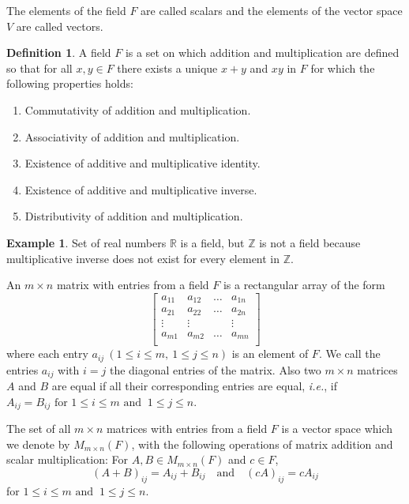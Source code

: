 \documentclass[12pt, a4paper]{article}
\theoremstyle{definition}
\newtheorem{definition}{Definition}[section]
\newtheorem{example}{Example}[section]
\theoremstyle{remark}
\theoremstyle{solution}
\begin{document}
The elements of the field $F$ are called scalars and the elements of the vector space $V$ are called vectors.

\begin{definition}
    A field $F$ is a set on which addition and multiplication are defined so that for all $x,y \in F$ there exists a unique $x + y$ and $xy$ in $F$ for which the following properties holds:
\end{definition}

\begin{enumerate}[label=(F \arabic*), leftmargin=0.7in]
    \item Commutativity of addition and multiplication.
    \item Associativity of addition and multiplication.
    \item Existence of additive and multiplicative identity.
    \item Existence of additive and multiplicative inverse.
    \item Distributivity of addition and multiplication.
\end{enumerate}

\begin{example}
    Set of real numbers $\mathbb{R}$ is a field, but $\mathbb{Z}$ is not a field because multiplicative inverse does not exist for every element in $\mathbb{Z}$.
\end{example}

An $m \times n$ matrix with entries from a field $F$ is a rectangular array of the form
\[
\begin{bmatrix}
    a_{11} & a_{12} & \dots & a_{1n} \\
    a_{21} & a_{22} & \dots & a_{2n} \\
    \vdots & \vdots &  & \vdots \\
    a_{m1} & a_{m2} & \dots & a_{mn} \\
\end{bmatrix}
\]
where each entry $a_{ij} \ (1 \le i \le m, \ 1 \le j \le n)$ is an element of $F$. We call the entries $a_{ij}$ with $i=j$ the diagonal entries of the matrix. Also two $m \times n$ matrices $A$ and $B$ are equal if all their corresponding entries are equal, \textit{i.e.}, if $A_{ij} = B_{ij} \text{ for } 1 \le i \le m \text{ and } \ 1 \le j \le n$.

\vspace{0.2cm}

The set of all $m \times n$ matrices with entries from a field $F$ is a vector space which we denote by $M_{m \times n}(F)$, with the following operations of matrix addition and scalar multiplication: For $A, B \in M_{m \times n}(F)$ and $c \in F$,
\[
(A+B)_{ij} = A_{ij} + B_{ij} \quad \text{and} \quad (cA)_{ij} = cA_{ij}
\]
for $1 \le i \le m \text{ and } \ 1 \le j \le n$.
\end{document}

